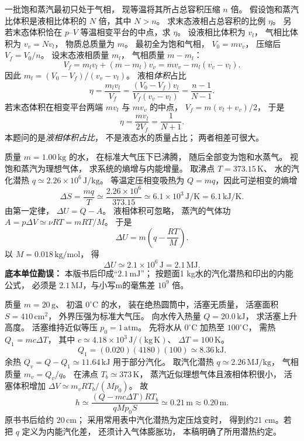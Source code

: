 一批饱和蒸汽最初只处于气相，
现等温将其所占总容积压缩 $n$ 倍。
假设饱和蒸汽比体积是液相比体积的
$N$ 倍，其中 $N>n$。
求末态液相占总容积的比例 $\eta$。
另若末态体积恰在
$p$--$V$ 等温相变平台的中点，求 $\eta$。
\exsolution
设液相比体积为 $v_l$，
气相比体积为 $v_v=Nv_l$，
物质总质量为 $m$。
最初全为饱和气相，
$V_0=mv_v$，
压缩后 $V_f=V_0/n$。
设末态液相质量 $m_l$，
气相质量 $m-m_l$：
\[
V_f=m_lv_l+(m-m_l)v_v
=mv_v-m_l(v_v-v_l).
\]
因此
$m_l=(V_0-V_f)/(v_v-v_l)$。
液相\emph{体积}占比
\[
\eta=\frac{m_lv_l}{V_f}
=\frac{(V_0-V_f)v_l}{V_f(v_v-v_l)}
=\boxed{\frac{n-1}{N-1}}.
\]
若末态体积在相变平台两端
$mv_l$ 与 $mv_v$ 的中点，
$V_f=m(v_l+v_v)/2$，
于是
\[
\boxed{\eta=\frac{mv_l}{2V_f}
=\frac1{N+1}}.
\]
\excheck 本题问的是\emph{液相体积占比}，
不是液态水的质量占比；
两者相差可很大。

质量 $m=1.00\,\mathrm{kg}$ 的水，
在标准大气压下已沸腾，
随后全部变为饱和水蒸气。
视饱和蒸汽为理想气体，
求系统的熵增与内能增量。
\exsolution
取沸点
$T=373.15\,\mathrm K$、
水的汽化潜热
$q\simeq2.26\times10^6\,\mathrm{J/kg}$。
等温定压相变吸热为
$Q=mq$，因此可逆相变的熵增
\[
\boxed{\Delta S=\frac{mq}{T}
\simeq\frac{2.26\times10^6}{373.15}
\simeq6.1\times10^3\,\mathrm{J/K}
=6.1\,\mathrm{kJ/K}}.
\]
由第一定律，
$\Delta U=Q-A$。
液相体积可忽略，
蒸汽的气体功
$A=p\Delta V\simeq\nu RT=mRT/M$。
于是
\[
\boxed{\Delta U=m\left(q-\frac{RT}{M}\right)}.
\]
以 $M=0.018\,\mathrm{kg/mol}$，
得
\[
\boxed{\Delta U\simeq2.1\times10^6\,\mathrm J
=2.1\,\mathrm{MJ}}.
\]
\excheck \textbf{底本单位勘误：}
本版书后印成“$2.1\,\mathrm{mJ}$”；
按题面1 kg水的汽化潜热和印出的内能公式，
必须是 $2.1\,\mathrm{MJ}$，与小写m的毫焦差 $10^9$ 倍。

质量 $m=20\,\mathrm g$、
初温 $0^\circ\mathrm C$ 的水，
装在绝热圆筒中，活塞无质量，
活塞面积
$S=410\,\mathrm{cm^2}$，
外界压强为标准大气压。
向水传入热量
$Q=20.0\,\mathrm{kJ}$，
求活塞上升高度。
\exsolution
活塞维持近似等压
$p_0=1\,\mathrm{atm}$。
先将水从 $0^\circ\mathrm C$
加热至 $100^\circ\mathrm C$，
需热
$Q_1=mc\Delta T$，
其中 $c\simeq4.18\times10^3\,\mathrm{J/(kg\,K)}$、
$\Delta T=100\,\mathrm K$。
\[
Q_1=(0.020)(4180)(100)\simeq8.36\,\mathrm{kJ}.
\]
余热
$Q_v=Q-Q_1\simeq11.64\,\mathrm{kJ}$
用于部分汽化。
取汽化潜热
$q\simeq2.26\,\mathrm{MJ/kg}$，
气相质量
$m_v=Q_v/q$。
在沸点 $T_b\simeq373\,\mathrm K$，
蒸汽近似理想气体且液相体积很小，
活塞体积增加
$\Delta V\simeq m_vRT_b/(Mp_0)$。
故
\[
\boxed{h\simeq
\frac{(Q-mc\Delta T)RT_b}{qMp_0S}}
\simeq\boxed{0.21\,\mathrm m\approx0.20\,\mathrm m}.
\]
\excheck 原书书后给约 $20\,\mathrm{cm}$；
采用常用表中汽化潜热为定压焓变时，
得到约21 cm。若把 $q$ 定义为内能汽化差，
还须计入气体膨胀功，
本稿明确了所用潜热约定。

